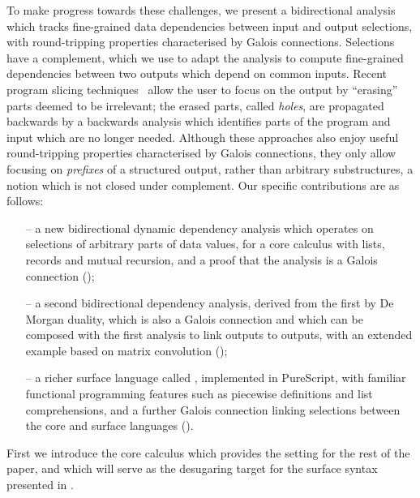 To make progress towards these challenges, we present a bidirectional analysis which tracks fine-grained data dependencies between input and output selections, with round-tripping properties characterised by Galois connections. Selections have a complement, which we use to adapt the analysis to compute fine-grained dependencies between two outputs which depend on common inputs. Recent program slicing techniques~\cite{perera12a,perera13a,ricciotti17} allow the user to focus on the output by ``erasing'' parts deemed to be irrelevant; the erased parts, called \emph{holes}, are propagated backwards by a backwards analysis which identifies parts of the program and input which are no longer needed. Although these approaches also enjoy useful round-tripping properties characterised by Galois connections, they only allow focusing on \emph{prefixes} of a structured output, rather than arbitrary substructures, a notion which is not closed under complement. Our specific contributions are as follows:

\begin{itemize}
   \item[--] a new bidirectional dynamic dependency analysis which operates on selections of arbitrary parts of data values, for a core calculus with lists, records and mutual recursion, and a proof that the analysis is a Galois connection ();
   \item[--] a second bidirectional dependency analysis, derived from the first by De Morgan duality, which is also a Galois connection and which can be composed with the first analysis to link outputs to outputs, with an extended example based on matrix convolution  ();
   \item[--] a richer surface language called \OurLanguage, implemented in PureScript, with familiar functional programming features such as piecewise definitions and list comprehensions, and a further Galois connection linking selections between the core and surface languages ().
\end{itemize}

\noindent First we introduce the core calculus which provides the setting for the rest of the paper, and which will serve as the desugaring target for the surface syntax presented in .
